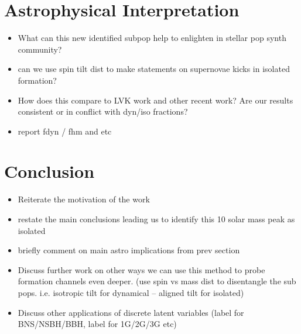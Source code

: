\section{Astrophysical Interpretation} \label{sec:astro}

\begin{itemize}
    \item What can this new identified subpop help to enlighten in stellar pop synth community?
    \item can we use spin tilt dist to make statements on supernovae kicks in isolated formation?
    \item How does this compare to LVK work and other recent work? Are our results consistent or in conflict with dyn/iso fractions?
    \item report fdyn / fhm and etc
\end{itemize}

\section{Conclusion} \label{sec:conclusion}

\begin{itemize}
    \item Reiterate the motivation of the work
    \item restate the main conclusions leading us to identify this 10 solar mass peak as isolated
    \item briefly comment on main astro implications from prev section
    \item Discuss further work on other ways we can use this method to probe formation channels even deeper. (use spin vs mass dist to disentangle the sub pops. i.e. isotropic tilt for dynamical -- aligned tilt for isolated)
    \item Discuss other applications of discrete latent variables (label for BNS/NSBH/BBH, label for 1G/2G/3G etc)
\end{itemize}
